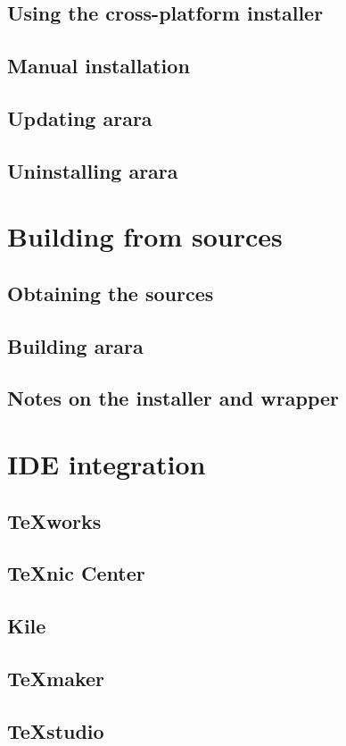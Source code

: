 \documentclass[a4paper,twoside,12pt]{memoir}
\begin{document}
\section{Using the cross-platform installer}
\section{Manual installation}
\section{Updating arara}
\section{Uninstalling arara}

\chapter{Building from sources}
\section{Obtaining the sources}
\section{Building arara}
\section{Notes on the installer and wrapper}

\chapter{IDE integration}
\section{TeXworks}
\section{TeXnic Center}
\section{Kile}
\section{TeXmaker}
\section{TeXstudio}
\end{document}
